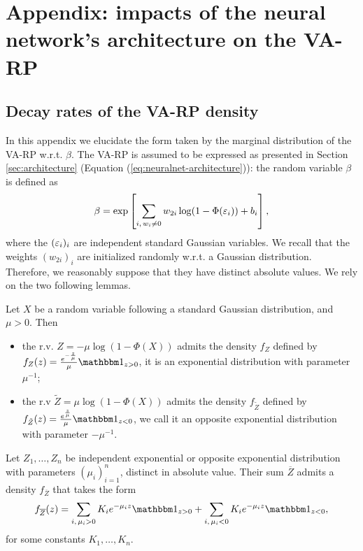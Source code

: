 \section{Appendix: impacts of the neural network's architecture on the VA-RP}




\subsection{Decay rates of the VA-RP density}\label{app:decay-rates}

In this appendix we elucidate the form taken by the marginal distribution of the VA-RP w.r.t. $\beta$.
The VA-RP is assumed to be expressed as presented in Section \ref{sec:architecture} (Equation (\ref{eq:neuralnet-architecture})): the random variable $\beta$ is defined as
    \begin{equation}\label{eq:app-expr-beta}
        \beta = \exp\left[\sum_{i,\,w_i\ne0}w_{2i}\log(1-\Phi(\varepsilon_i)) + b_i\right],
    \end{equation}
where the $(\varepsilon_i)_i$ are independent standard Gaussian variables.
We recall that the weights $(w_{2i})_{i}$ are initialized randomly w.r.t. a Gaussian distribution. Therefore, we reasonably suppose that they have distinct absolute values.
We rely on the two following lemmas.
\begin{lem}\label{lemma:expon-distrib}
    Let $X$ be a random variable following a standard Gaussian distribution, and $\mu>0$. Then
    \begin{itemize}
        \item the r.v. $Z=-\mu\log(1-\Phi(X))$ admits the density $f_Z$ defined by $f_Z(z)=\frac{e^{-\frac{z}{\mu}}}{\mu}\indic_{z>0}$, it is an exponential distribution with parameter $\mu^{-1}$;
        \item the r.v $\tilde Z=\mu\log(1-\Phi(X))$ admits the density $f_{\tilde Z}$ defined by $f_{\tilde Z}(z)= \frac{e^{\frac{z}{\mu}}}{\mu}\indic_{z<0}$, we call it an opposite exponential distribution with parameter $-\mu^{-1}$.
    \end{itemize}
\end{lem}
\begin{lem}\label{lemma:sum-of-expon}
    Let $Z_1,\dots,Z_n$ be independent exponential or opposite exponential distribution with parameters $(\mu_{i})_{i=1}^n$, distinct in absolute value. Their sum $\overline{Z}$ admits a density $f_{\overline{Z}}$ that takes the form
        \begin{equation}\label{eq:lem-pdf-Z}
            f_{\overline{Z}}(z) = \sum_{i,\,\mu_i>0}K_ie^{-\mu_i z}\indic_{z>0} + \sum_{i,\,\mu_i<0}K_ie^{-\mu_iz}\indic_{z<0},
        \end{equation}
    for some constants $K_1,\dots,K_n$.
\end{lem}


